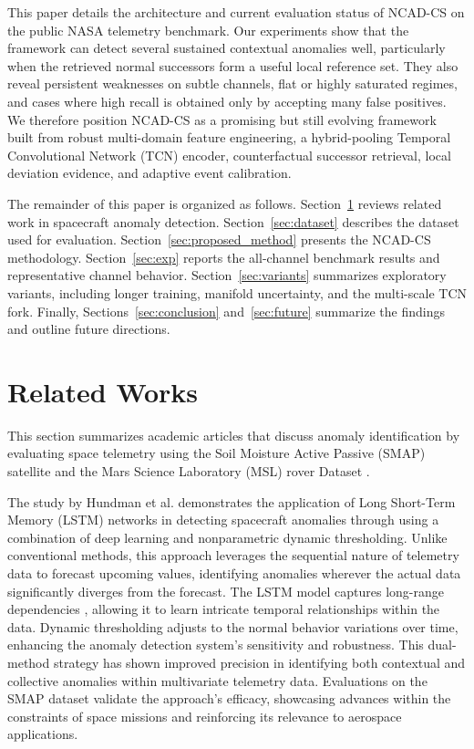 \documentclass[journal]{IEEEtran}
\begin{document}
This paper details the architecture and current evaluation status of NCAD-CS on the public NASA telemetry benchmark. Our experiments show that the framework can detect several sustained contextual anomalies well, particularly when the retrieved normal successors form a useful local reference set. They also reveal persistent weaknesses on subtle channels, flat or highly saturated regimes, and cases where high recall is obtained only by accepting many false positives. We therefore position NCAD-CS as a promising but still evolving framework built from robust multi-domain feature engineering, a hybrid-pooling Temporal Convolutional Network (TCN) encoder, counterfactual successor retrieval, local deviation evidence, and adaptive event calibration.

The remainder of this paper is organized as follows. Section~\ref{sec:related} reviews related work in spacecraft anomaly detection. Section~\ref{sec:dataset} describes the dataset used for evaluation. Section~\ref{sec:proposed_method} presents the NCAD-CS methodology. Section~\ref{sec:exp} reports the all-channel benchmark results and representative channel behavior. Section~\ref{sec:variants} summarizes exploratory variants, including longer training, manifold uncertainty, and the multi-scale TCN fork. Finally, Sections~\ref{sec:conclusion} and~\ref{sec:future} summarize the findings and outline future directions.

\section{Related Works}
\label{sec:related}

This section summarizes academic articles that discuss anomaly identification by evaluating space telemetry using the Soil Moisture Active Passive (SMAP) satellite and the Mars Science Laboratory (MSL) rover Dataset \cite{Hundman2018b}. 

The study by Hundman et al. demonstrates the application of Long Short-Term Memory (LSTM) networks in detecting spacecraft anomalies through using a combination of deep learning and nonparametric dynamic thresholding. Unlike conventional methods, this approach leverages the sequential nature of telemetry data to forecast upcoming values, identifying anomalies wherever the actual data significantly diverges from the forecast. The LSTM model captures long-range dependencies \cite{hua2019deep}, allowing it to learn intricate temporal relationships within the data. Dynamic thresholding adjusts to the normal behavior variations over time, enhancing the anomaly detection system's sensitivity and robustness. This dual-method strategy has shown improved precision in identifying both contextual and collective anomalies within multivariate telemetry data. Evaluations on the SMAP dataset validate the approach's efficacy, showcasing advances within the constraints of space missions and reinforcing its relevance to aerospace applications.
\end{document}

